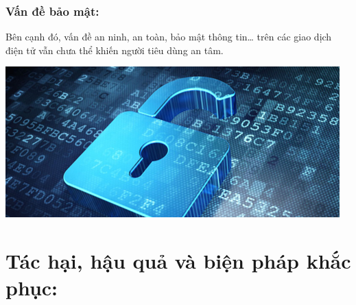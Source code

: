 \documentclass[13pt,a4paper]{article}
\begin{document}
    \subsubsection{Vấn đề bảo mật:}
    Bên cạnh đó, vấn đề an ninh, an toàn, bảo mật thông tin… trên các giao dịch điện tử vẫn chưa thể khiến người tiêu dùng an tâm.
    \begin{center}
    \includegraphics[scale=1]{images/khoa.png} \\
    \fontsize{10pt}{1.2pt}\selectfont
    \end{center}
    
\section{Tác hại, hậu quả và biện pháp khắc phục:}



	
	


\newpage
\end{document}
